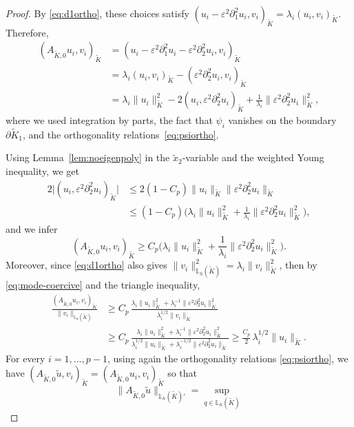 \documentclass[a4paper,twoside,10pt]{article}
\newcommand{\AKO}{{A_{\tilde K,0}}}
\newcommand{\eps}{\varepsilon}
\numberwithin{equation}{section}
\newcommand{\Kt}{\widetilde{K}}
\begin{document}
\begin{proof}
	By \eqref{eq:d1ortho}, these choices satisfy
	$ (u_i-\eps^2\partial_1^2u_i,v_i)_{\Kt} = \lambda_i(u_i,v_i)_{\Kt}$.
	Therefore,
	\begin{align*}
	(\AKO u_i,v_i)_{\Kt}
	&=
	(u_i-\eps^2\partial_1^2u_i-\eps^2\partial_2^2u_i,v_i)_{\Kt}
	\\
	&=
	\lambda_i(u_i,v_i)_{\Kt}
	-(\eps^2\partial_2^2u_i,v_i)_{\Kt}
	\\
	&=
	\lambda_i\|u_i\|_{\Kt}^2
	-2(u_i,\eps^2\partial_2^2u_i)_{\Kt}
	+\frac{1}{\lambda_i}\|\eps^2\partial_2^2u_i\|_{\Kt}^2,
	\end{align*}
	where we used integration by parts, the fact that $\psi_i$ vanishes on the boundary $\partial \Kt_1$, and the 
    orthogonality relations~\eqref{eq:psiortho}.
	
	Using Lemma~\ref{lem:noeigenpoly} in the \(\widetilde x_2\)-variable and the weighted Young inequality, we get
	\begin{align*}
	2\big|(u_i,\eps^2\partial_2^2u_i)_{\Kt}\big|
	&\le
	2(1-C_p)\|u_i\|_{\Kt}
	\|\eps^2\partial_2^2u_i\|_{\Kt}
	\\
	&\le
	(1-C_p)
	\Big(
	\lambda_i\|u_i\|_{\Kt}^2
	+\frac1{\lambda_i}\|\eps^2\partial_2^2u_i\|_{\Kt}^2
	\Big),
	\end{align*}
	and we infer
	\begin{equation}\label{eq:mode-coercive}
	(\AKO u_i,v_i)_{\Kt}
	\ge
	C_p
	\Big(
	\lambda_i\|u_i\|_{\Kt}^2
	+\frac1{\lambda_i}\|\eps^2\partial_2^2u_i\|_{\Kt}^2
	\Big).
	\end{equation}
	Moreover, since \eqref{eq:d1ortho} also gives $ \|v_i\|_{\mathbb L_h(\Kt)}^2 = \lambda_i\|v_i\|_{\Kt}^2$,
	 then by \eqref{eq:mode-coercive} and the triangle inequality, 
	\begin{align*}
	\frac{(\AKO u_i,v_i)_{\Kt}}{\|v_i\|_{\mathbb L_h(\Kt)}}
	&\ge
	C_p\,
	\frac{
	\lambda_i\|u_i\|_{\Kt}^2
	+\lambda_i^{-1}\|\eps^2\partial_2^2u_i\|_{\Kt}^2
	}{
	\lambda_i^{1/2}\|v_i\|_{\Kt}
	}
	\\
	&\ge
	C_p\,
	\frac{
	\lambda_i\|u_i\|_{\Kt}^2
	+\lambda_i^{-1}\|\eps^2\partial_2^2u_i\|_{\Kt}^2
	}{
	\lambda_i^{1/2}\|u_i\|_{\Kt}
	+\lambda_i^{-1/2}\|\eps^2\partial_2^2u_i\|_{\Kt}
	}
	\ge
	\frac{C_p}{2}\,\lambda_i^{1/2}\|u_i\|_{\Kt}.
	\end{align*}
	For every $i=1,\dots,p-1$, using again the orthogonality relations \eqref{eq:psiortho}, we have
	$
	(\AKO \tilde u,v_i)_{\Kt}
	=
	(\AKO u_i,v_i)_{\Kt}
	$
so that
	\begin{equation*}
	\|\AKO\tilde u\|_{\mathbb L_h(\Kt)'}
	=
	\sup_{q\in \mathbb L_h(\Kt)}

\end{equation*}
\end{proof}
\end{document}
